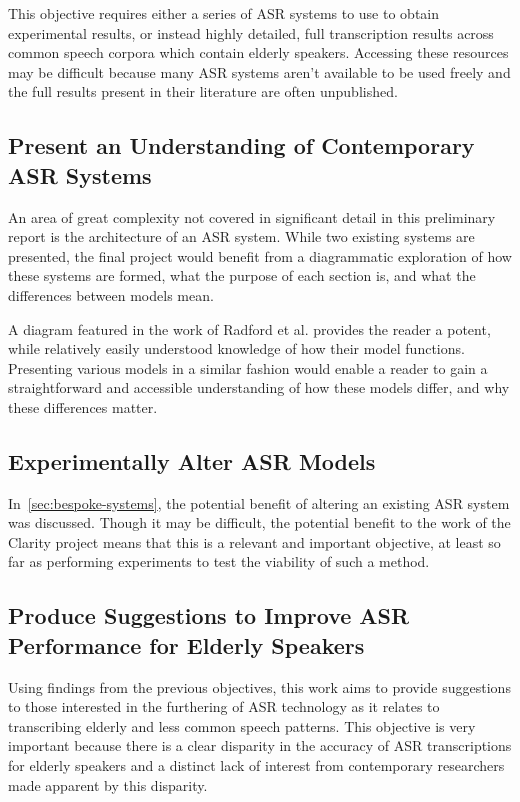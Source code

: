 This objective requires either a series of ASR systems to use to obtain experimental results, or
instead highly detailed, full transcription results across common speech corpora which contain
elderly speakers.
Accessing these resources may be difficult because many ASR systems aren't available to be used
freely and the full results present in their literature are often unpublished.

\subsection{Present an Understanding of Contemporary ASR Systems}\label{subsec:aim2andahalf}

An area of great complexity not covered in significant detail in this preliminary report is the
architecture of an ASR system.
While two existing systems are presented, the final project would benefit from a diagrammatic
exploration of how these systems are formed, what the purpose of each section is, and what the
differences between models mean.

A diagram featured in the work of Radford et al.\cite{whisper} provides the reader a potent, while
relatively easily understood knowledge of how their model functions.
Presenting various models in a similar fashion would enable a reader to gain a straightforward and
accessible understanding of how these models differ, and why these differences matter.

\subsection{Experimentally Alter ASR Models}\label{subsec:aim3}

In~\ref{sec:bespoke-systems}, the potential benefit of altering an existing ASR system was
discussed.
Though it may be difficult, the potential benefit to the work of the Clarity project means that
this is a relevant and important objective, at least so far as performing experiments to test the
viability of such a method.

\subsection{Produce Suggestions to Improve ASR Performance for Elderly Speakers}\label{subsec:aim4}

Using findings from the previous objectives, this work aims to provide suggestions to those
interested in the furthering of ASR technology as it relates to transcribing elderly and less
common speech patterns.
This objective is very important because there is a clear disparity in the accuracy of ASR
transcriptions for elderly speakers and a distinct lack of interest from contemporary researchers
made apparent by this disparity.
